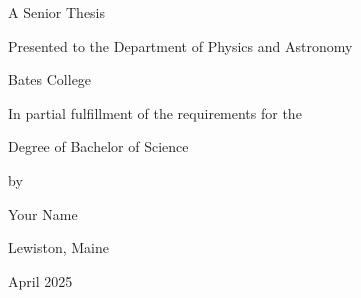 
\vspace*{4cm} 

\bigskip\bigskip
\centerline{A Senior Thesis}
\medskip
\centerline{Presented to the Department of Physics and Astronomy}
\medskip
\centerline{Bates College}
\medskip
\centerline{In partial fulfillment of the requirements for the}
\medskip
\centerline{Degree of Bachelor of Science}
\medskip
\centerline{by}
\medskip
\centerline{\Large Your Name}
\medskip
\centerline{Lewiston, Maine}
\medskip
\centerline{April 2025}

\newpage
